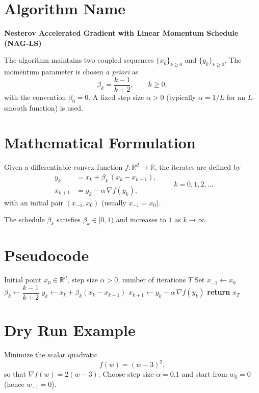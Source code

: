 \documentclass{article}
\newcommand{\grad}{\nabla}
\begin{document}
\section*{Algorithm Name}
\textbf{Nesterov Accelerated Gradient with Linear Momentum Schedule (NAG‑LS)}  

The algorithm maintains two coupled sequences \(\{x_k\}_{k\ge 0}\) and \(\{y_k\}_{k\ge 0}\).  
The momentum parameter is chosen \emph{a priori} as  
\[
\beta_k=\frac{k-1}{k+2},\qquad k\ge 0,
\]
with the convention \(\beta_0=0\).  
A fixed step size \(\alpha>0\) (typically \(\alpha=1/L\) for an \(L\)-smooth function) is used.

\section*{Mathematical Formulation}
Given a differentiable convex function \(f:\mathbb{R}^d\to\mathbb{R}\), the iterates are defined by
\[
\boxed{
\begin{aligned}
y_k &= x_k + \beta_k\,(x_k-x_{k-1}), \\
x_{k+1} &= y_k - \alpha \,\grad f(y_k),
\end{aligned}}
\qquad k=0,1,2,\dots
\]
with an initial pair \((x_{-1},x_0)\) (usually \(x_{-1}=x_0\)).  

The schedule \(\beta_k\) satisfies \(\beta_k\in[0,1)\) and increases to \(1\) as \(k\to\infty\).

\section*{Pseudocode}
\begin{algorithm}[H]
\caption{NAG‑LS}
\begin{algorithmic}[1]
\Require Initial point \(x_0\in\mathbb{R}^d\), step size \(\alpha>0\), number of iterations \(T\)
\State Set \(x_{-1}\gets x_0\)
    \State \(\beta_k \gets \dfrac{k-1}{k+2}\)   
    \State \(y_k \gets x_k + \beta_k (x_k-x_{k-1})\)
    \State \(x_{k+1} \gets y_k - \alpha\,\grad f(y_k)\)
\EndFor
\State \textbf{return} \(x_T\)
\end{algorithmic}
\end{algorithm}

\section*{Dry Run Example}
Minimize the scalar quadratic 
\[
f(w)=(w-3)^2,
\]
so that \(\grad f(w)=2(w-3)\).  
Choose step size \(\alpha=0.1\) and start from \(w_0=0\) (hence \(w_{-1}=0\)).  
\end{document}
